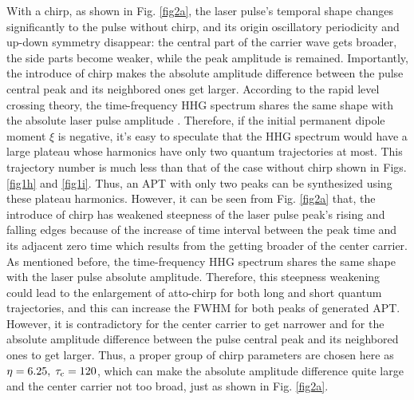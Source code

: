 \documentclass[10pt,letterpaper]{article}
\begin{document}
With a chirp, as shown in Fig. \ref{fig2a}, the laser pulse's temporal shape changes significantly to the pulse without chirp, and its origin oscillatory periodicity and up-down symmetry disappear: the central part of the carrier wave gets broader, the side parts become weaker, while the peak amplitude is remained. Importantly, the introduce of chirp makes the absolute amplitude difference between the pulse central peak and its neighbored ones get larger. According to the rapid level crossing theory, the time-frequency HHG spectrum shares the same shape with the absolute laser pulse amplitude \cite{CuiNi2010NJP-wavelet}. Therefore, if the initial permanent dipole moment $\xi$ is negative, it's easy to speculate that the HHG spectrum would have a large plateau whose harmonics have only two quantum trajectories at most. This trajectory number is much less than that of the case without chirp shown in Figs. \ref{fig1h} and \ref{fig1i}. Thus, an APT with only two peaks can be synthesized using these plateau harmonics. However, it can be seen from Fig. \ref{fig2a} that, the introduce of chirp has weakened steepness of the laser pulse peak's rising and falling edges because of the increase of time interval between the peak time and its adjacent zero time which results from the getting broader of the center carrier. As mentioned before, the time-frequency HHG spectrum shares the same shape with the laser pulse absolute amplitude. Therefore, this steepness weakening could lead to the enlargement of atto-chirp \cite{attochirp-ref1-2003,attochirp-ref2-2007,attochirp-ref3-2009} for both long and short quantum trajectories, and this can increase the FWHM for both peaks of generated APT. However, it is contradictory for the center carrier to get narrower and for the absolute amplitude difference between the pulse central peak and its neighbored ones to get larger. Thus, a proper group of chirp parameters are chosen here as $\eta=6.25,\;\tau_{\rm{c}}=120$, which can make the absolute amplitude difference quite large and the center carrier not too broad, just as shown in Fig. \ref{fig2a}.
\end{document}
